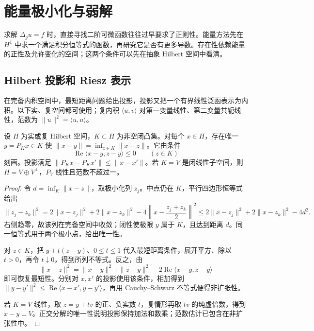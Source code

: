 
% 
% 

\section{能量极小化与弱解}
\label{g3:sec:1201}

求解 \(\Delta_g u=f\) 时，直接寻找二阶可微函数往往过早要求了正则性。能量方法先在 \(H^1\) 中求一个满足积分恒等式的函数，再研究它是否有更多导数。存在性依赖能量的正性及允许变化的空间；这两个条件可以先在抽象 Hilbert 空间中看清。

\subsection{Hilbert 投影和 Riesz 表示}
\label{g3:subsec:1201:01}
在完备内积空间中，最短距离问题给出投影，投影又把一个有界线性泛函表示为内积。以下实、复空间都可使用；复内积 \(\langle u,v\rangle\) 对第一变量线性、第二变量共轭线性，范数为 \(\|u\|^2=\langle u,u\rangle\)。

\begin{theorem}\label{g3:thm:hilbert-projection}
	设 \(H\) 为实或复 Hilbert 空间，\(K\subset H\) 为非空闭凸集。对每个 \(x\in H\)，存在唯一 \(y=P_Kx\in K\) 使 \(\|x-y\|=\inf_{z\in K}\|x-z\|\)。它由条件
	\[
		\operatorname{Re}\langle x-y,z-y\rangle\le0\qquad(z\in K)
	\]
	刻画。投影满足 \(\|P_Kx-P_Kx'\|\le\|x-x'\|\)。若 \(K=V\) 是闭线性子空间，则 \(H=V\oplus V^\perp\)，\(P_V\) 线性且范数不超过一。
\end{theorem}
\begin{proof}
	令 \(d=\inf_K\|x-z\|\)，取极小化列 \(z_j\)。中点仍在 \(K\)，平行四边形恒等式给出
	\[
		\|z_j-z_k\|^2
		=2\|x-z_j\|^2+2\|x-z_k\|^2
		-4\left\|x-\frac{z_j+z_k}{2}\right\|^2
		\le2\|x-z_j\|^2+2\|x-z_k\|^2-4d^2.
	\]
	右侧趋零，故该列在完备空间中收敛；闭性使极限 \(y\) 属于 \(K\)，且达到距离 \(d\)。同一恒等式用于两个极小点，给出唯一性。

	对 \(z\in K\)，把 \(y+t(z-y)\)、\(0\le t\le1\) 代入最短距离条件，展开平方、除以 \(t>0\)，再令 \(t\downarrow0\)，得到所列不等式。反之，由
	\[
		\|x-z\|^2=\|x-y\|^2+\|z-y\|^2
		-2\operatorname{Re}\langle x-y,z-y\rangle
	\]
	即可恢复最短性。分别对 \(x,x'\) 的投影使用该条件，相加得到
	\(\|y-y'\|^2\le\operatorname{Re}\langle x-x',y-y'\rangle\)，再用 Cauchy--Schwarz 不等式便得非扩张性。

	若 \(K=V\) 线性，取 \(z=y+tv\) 的正、负实数 \(t\)，复情形再取 \(tv\) 的纯虚倍数，得到 \(x-y\perp V\)。正交分解的唯一性说明投影保持加法和数乘；范数估计已包含在非扩张性中。
\end{proof}

